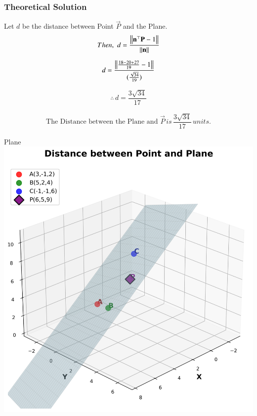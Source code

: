 \documentclass{beamer}
\begin{document}
\begin{frame}[fragile]
    \frametitle{Theoretical Solution}

Let $d$ be the distance between Point $\vec{P}$ and the Plane.
\begin{equation}
    Then, \, \, d = \dfrac{\left\lVert\mathbf{n}^\top\mathbf{P}-1\right\rVert}{\left\lVert\mathbf{n}\right\rVert}
\end{equation}

\begin{equation}
    d= \dfrac{\left\lVert\frac{18-20+27}{19}-1\right\rVert}{(\frac{\sqrt{34}}{19})}
\end{equation}

\begin{equation}
\therefore \, d = \dfrac{3\sqrt{34}}{17}    
\end{equation}

\begin{align}
    \boxed{\text{The Distance between the Plane and } \vec{P} \, is \, \dfrac{3\sqrt{34}}{17} \, units.}
\end{align}
\end{frame}


\begin{frame}{Plane}
   \centering
    \includegraphics[width=\columnwidth, height=0.8\textheight, keepaspectratio]{figs/fig1.png}
    \label{fig:Beamer/figs/fig1.png}
\end{frame}
\end{document}
